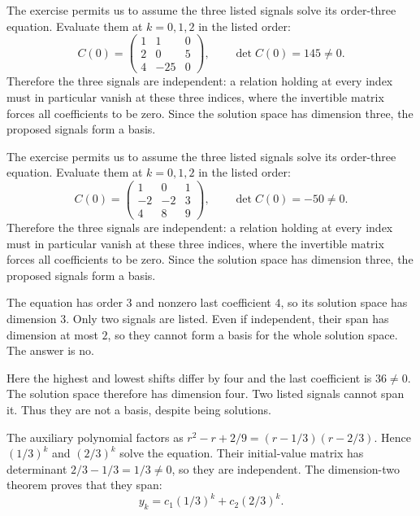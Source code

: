 The exercise permits us to assume the three listed signals solve its order-three equation. Evaluate them at $k=0,1,2$ in the listed order:
\[ C(0)=\begin{pmatrix}1&1&0\\2&0&5\\4&-25&0\end{pmatrix},\qquad\det C(0)=145\ne0.\]
Therefore the three signals are independent: a relation holding at every index must in particular vanish at these three indices, where the invertible matrix forces all coefficients to be zero. Since the solution space has dimension three, the proposed signals form a basis.

The exercise permits us to assume the three listed signals solve its order-three equation. Evaluate them at $k=0,1,2$ in the listed order:
\[ C(0)=\begin{pmatrix}1&0&1\\-2&-2&3\\4&8&9\end{pmatrix},\qquad\det C(0)=-50\ne0.\]
Therefore the three signals are independent: a relation holding at every index must in particular vanish at these three indices, where the invertible matrix forces all coefficients to be zero. Since the solution space has dimension three, the proposed signals form a basis.

The equation has order $3$ and nonzero last coefficient $4$, so its solution
space has dimension $3$. Only two signals are listed. Even if independent,
their span has dimension at most $2$, so they cannot form a basis for the
whole solution space. The answer is no.

Here the highest and lowest shifts differ by four and the last coefficient
is $36\ne0$. The solution space therefore has dimension four. Two listed
signals cannot span it. Thus they are not a basis, despite being solutions.

The auxiliary polynomial factors as
$r^2-r+2/9=(r-1/3)(r-2/3)$. Hence $(1/3)^k$ and $(2/3)^k$ solve
the equation. Their initial-value matrix has determinant $2/3-1/3=1/3\ne0$,
so they are independent. The dimension-two theorem proves that they span:
\[
 y_k=c_1(1/3)^k+c_2(2/3)^k.
\]

